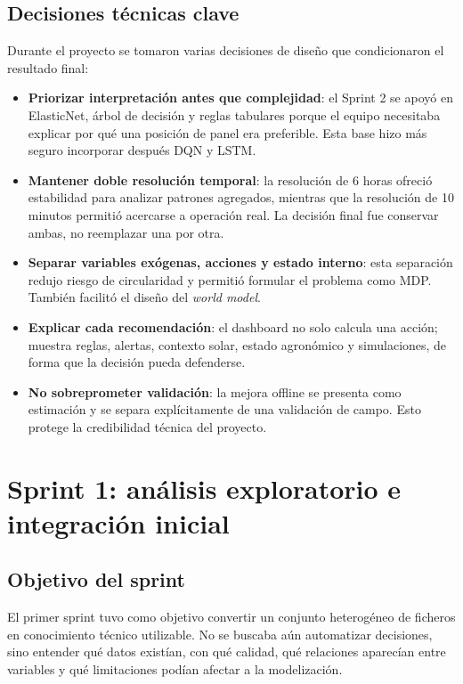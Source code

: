 ﻿\documentclass[11pt,a4paper]{article}
\begin{document}
\subsection{Decisiones técnicas clave}

Durante el proyecto se tomaron varias decisiones de diseño que condicionaron el resultado final:

\begin{itemize}
    \item \textbf{Priorizar interpretación antes que complejidad}: el Sprint 2 se apoyó en ElasticNet, árbol de decisión y reglas tabulares porque el equipo necesitaba explicar por qué una posición de panel era preferible. Esta base hizo más seguro incorporar después DQN y LSTM.
    \item \textbf{Mantener doble resolución temporal}: la resolución de 6 horas ofreció estabilidad para analizar patrones agregados, mientras que la resolución de 10 minutos permitió acercarse a operación real. La decisión final fue conservar ambas, no reemplazar una por otra.
    \item \textbf{Separar variables exógenas, acciones y estado interno}: esta separación redujo riesgo de circularidad y permitió formular el problema como MDP. También facilitó el diseño del \emph{world model}.
    \item \textbf{Explicar cada recomendación}: el dashboard no solo calcula una acción; muestra reglas, alertas, contexto solar, estado agronómico y simulaciones, de forma que la decisión pueda defenderse.
    \item \textbf{No sobreprometer validación}: la mejora offline se presenta como estimación y se separa explícitamente de una validación de campo. Esto protege la credibilidad técnica del proyecto.
\end{itemize}
\newpage

\section{Sprint 1: análisis exploratorio e integración inicial}

\subsection{Objetivo del sprint}

El primer sprint tuvo como objetivo convertir un conjunto heterogéneo de ficheros en conocimiento técnico utilizable. No se buscaba aún automatizar decisiones, sino entender qué datos existían, con qué calidad, qué relaciones aparecían entre variables y qué limitaciones podían afectar a la modelización.
\end{document}
